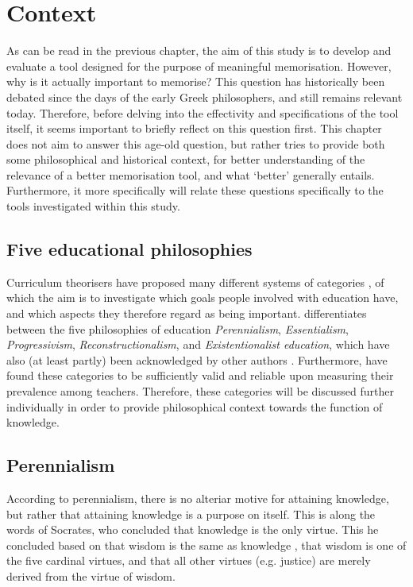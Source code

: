 \chapter{Context}

As can be read in the previous chapter, the aim of this study is to develop and evaluate a tool designed for the purpose of meaningful memorisation. However, why is it actually important to memorise? This question has historically been debated since the days of the early Greek philosophers, and still remains relevant today. Therefore, before delving into the effectivity and specifications of the tool itself, it seems important to briefly reflect on this question first. This chapter does not aim to answer this age-old question, but rather tries to provide both some philosophical and historical context, for better understanding of the relevance of a better memorisation tool, and what `better' generally entails. Furthermore, it more specifically will relate these questions specifically to the tools investigated within this study.

\section{Five educational philosophies}

Curriculum theorisers have proposed many different systems of categories \cite{curriculumtheory}, of which the aim is to investigate which goals people involved with education have, and which aspects they therefore regard as being important.  differentiates between the five philosophies of education \emph{Perennialism}, \emph{Essentialism}, \emph{Progressivism}, \emph{Reconstructionalism}, and \emph{Existentionalist education}, which have also (at least partly) been acknowledged by other authors \cite{educationalphilosophy, educationalphilosophy2, educationalphilosophy3, educationalphilosophy4}. Furthermore,  have found these categories to be sufficiently valid and reliable upon measuring their prevalence among teachers. Therefore, these categories will be discussed further individually in order to provide philosophical context towards the function of knowledge.

\section{Perennialism}

According to perennialism, there is no alteriar motive for attaining knowledge, but rather that attaining knowledge is a purpose on itself. This is along the words of Socrates, who concluded that knowledge is the only virtue. This he concluded based on that wisdom is the same as knowledge \cite{wisdomknowledge}, that wisdom is one of the five cardinal virtues, and that all other virtues (e.g. justice) are merely derived from the virtue of wisdom.

